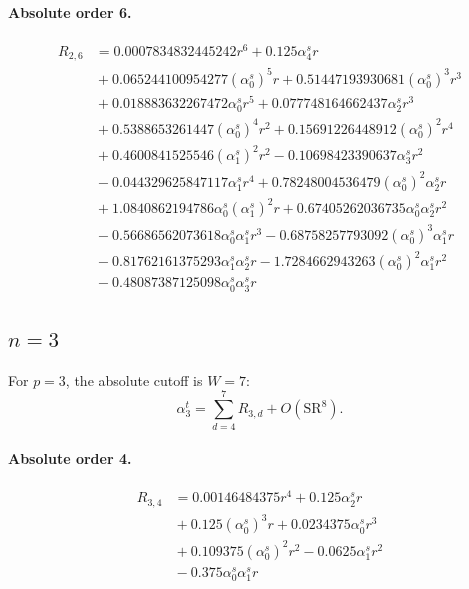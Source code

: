 \documentclass[10pt]{article}
\begin{document}
\paragraph{Absolute order 6.}
\begin{align*}
R_{2,6} &= 0.0007834832445242 r^{6} + 0.125 \alpha_{4}^s r \\
&{}  + 0.065244100954277 \left(\alpha_{0}^s\right)^{5} r + 0.51447193930681 \left(\alpha_{0}^s\right)^{3} r^{3} \\
&{}  + 0.018883632267472 \alpha_{0}^s r^{5} + 0.077748164662437 \alpha_{2}^s r^{3} \\
&{}  + 0.5388653261447 \left(\alpha_{0}^s\right)^{4} r^{2} + 0.15691226448912 \left(\alpha_{0}^s\right)^{2} r^{4} \\
&{}  + 0.4600841525546 \left(\alpha_{1}^s\right)^{2} r^{2} - 0.10698423390637 \alpha_{3}^s r^{2} \\
&{}  - 0.044329625847117 \alpha_{1}^s r^{4} + 0.78248004536479 \left(\alpha_{0}^s\right)^{2} \alpha_{2}^s r \\
&{}  + 1.0840862194786 \alpha_{0}^s \left(\alpha_{1}^s\right)^{2} r + 0.67405262036735 \alpha_{0}^s \alpha_{2}^s r^{2} \\
&{}  - 0.56686562073618 \alpha_{0}^s \alpha_{1}^s r^{3} - 0.68758257793092 \left(\alpha_{0}^s\right)^{3} \alpha_{1}^s r \\
&{}  - 0.81762161375293 \alpha_{1}^s \alpha_{2}^s r - 1.7284662943263 \left(\alpha_{0}^s\right)^{2} \alpha_{1}^s r^{2} \\
&{}  - 0.48087387125098 \alpha_{0}^s \alpha_{3}^s r
\end{align*}

\subsection{$n=3$}
For $p=3$, the absolute cutoff is $W=7$:
\[\alpha_{3}^t=\sum_{d=4}^{7}R_{3,d}+O(\mathrm{SR}^{8}).\]
\paragraph{Absolute order 4.}
\begin{align*}
R_{3,4} &= 0.00146484375 r^{4} + 0.125 \alpha_{2}^s r \\
&{}  + 0.125 \left(\alpha_{0}^s\right)^{3} r + 0.0234375 \alpha_{0}^s r^{3} \\
&{}  + 0.109375 \left(\alpha_{0}^s\right)^{2} r^{2} - 0.0625 \alpha_{1}^s r^{2} \\
&{}  - 0.375 \alpha_{0}^s \alpha_{1}^s r
\end{align*}
\end{document}
